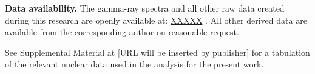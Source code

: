 \documentclass[onecolumn,epjc3]{svjour3}
\begin{document}
{\small \textbf{Data availability.} The gamma-ray spectra and all other raw data created during this research are openly available at: \url{XXXXX} \cite{}. All other derived data  are available from the corresponding author on reasonable request.}



{\small  See Supplemental Material at [URL will be inserted by publisher] for a tabulation of the relevant nuclear data used in the analysis for the present work.}



% 
% 
\appendix







% 



% 


\end{document}

